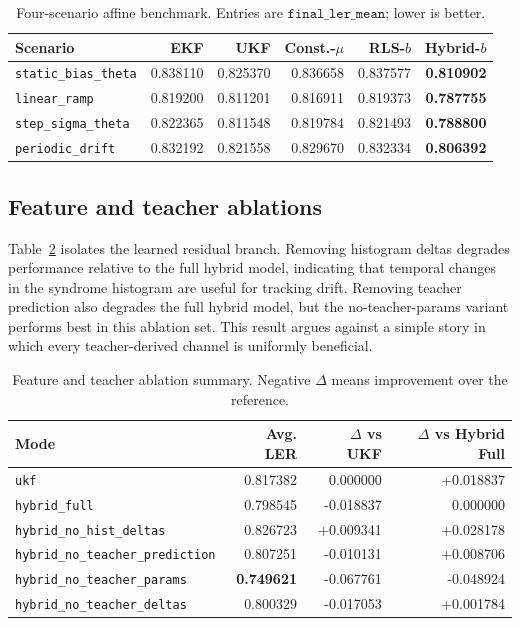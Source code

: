 \documentclass[11pt]{article}
\begin{document}
\begin{table}[ht]
\centering
\small
\begin{tabular}{lrrrrr}
\toprule
Scenario & EKF & UKF & Const.-\(\mu\) & RLS-\(b\) & Hybrid-\(b\) \\
\midrule
\texttt{static\_bias\_theta} & 0.838110 & 0.825370 & 0.836658 & 0.837577 & \textbf{0.810902} \\
\texttt{linear\_ramp} & 0.819200 & 0.811201 & 0.816911 & 0.819373 & \textbf{0.787755} \\
\texttt{step\_sigma\_theta} & 0.822365 & 0.811548 & 0.819784 & 0.821493 & \textbf{0.788800} \\
\texttt{periodic\_drift} & 0.832192 & 0.821558 & 0.829670 & 0.832334 & \textbf{0.806392} \\
\bottomrule
\end{tabular}
\caption{Four-scenario affine benchmark.  Entries are
\(\texttt{final\_ler\_mean}\); lower is better.}
\label{tab:five-mode-benchmark}
\end{table}

\subsection{Feature and teacher ablations}

Table~\ref{tab:feature-ablation} isolates the learned residual branch.  Removing
histogram deltas degrades performance relative to the full hybrid model,
indicating that temporal changes in the syndrome histogram are useful for
tracking drift.  Removing teacher prediction also degrades the full hybrid
model, but the no-teacher-params variant performs best in this ablation set.
This result argues against a simple story in which every teacher-derived
channel is uniformly beneficial.

\begin{table}[ht]
\centering
\small
\begin{tabular}{lrrr}
\toprule
Mode & Avg. LER & \(\Delta\) vs UKF & \(\Delta\) vs Hybrid Full \\
\midrule
\texttt{ukf} & 0.817382 & 0.000000 & +0.018837 \\
\texttt{hybrid\_full} & 0.798545 & -0.018837 & 0.000000 \\
\texttt{hybrid\_no\_hist\_deltas} & 0.826723 & +0.009341 & +0.028178 \\
\texttt{hybrid\_no\_teacher\_prediction} & 0.807251 & -0.010131 & +0.008706 \\
\texttt{hybrid\_no\_teacher\_params} & \textbf{0.749621} & -0.067761 & -0.048924 \\
\texttt{hybrid\_no\_teacher\_deltas} & 0.800329 & -0.017053 & +0.001784 \\
\bottomrule
\end{tabular}
\caption{Feature and teacher ablation summary.  Negative
\(\Delta\) means improvement over the reference.}
\label{tab:feature-ablation}
\end{table}
\end{document}
